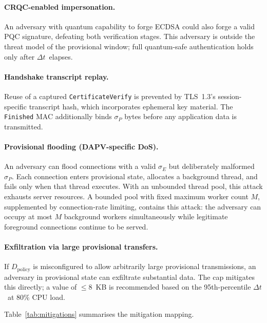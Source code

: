 \documentclass[preprint,10pt,3p]{elsarticle}
\newcommand{\Dt}{\ensuremath{\Delta t}}
\begin{document}
\paragraph{CRQC-enabled impersonation.}
An adversary with quantum capability to forge ECDSA could also forge a valid
PQC signature, defeating both verification stages.  This adversary is outside
the threat model of the provisional window; full quantum-safe authentication
holds only after \Dt\ elapses.

\paragraph{Handshake transcript replay.}
Reuse of a captured \texttt{CertificateVerify} is prevented by TLS~1.3's
session-specific transcript hash, which incorporates ephemeral key material.
The \texttt{Finished} MAC additionally binds $\sigma_P$ bytes before any
application data is transmitted.

\paragraph{Provisional flooding (DAPV-specific DoS).}
An adversary can flood connections with a valid $\sigma_E$ but deliberately
malformed $\sigma_P$.  Each connection enters provisional state, allocates a
background thread, and fails only when that thread executes.  With an unbounded
thread pool, this attack exhausts server resources.  A bounded pool with fixed
maximum worker count $M$, supplemented by connection-rate limiting, contains
this attack: the adversary can occupy at most $M$ background workers
simultaneously while legitimate foreground connections continue to be served.

\paragraph{Exfiltration via large provisional transfers.}
If $D_\text{policy}$ is misconfigured to allow arbitrarily large provisional
transmissions, an adversary in provisional state can exfiltrate substantial data.
The cap mitigates this directly; a value of $\leq 8$~KB is recommended based on
the 95th-percentile \Dt\ at 80\% CPU load.

Table~\ref{tab:mitigations} summarises the mitigation mapping.
\end{document}

